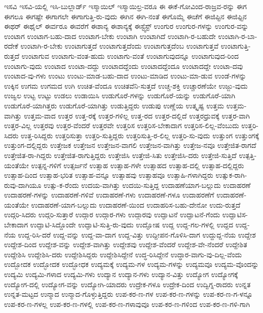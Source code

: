 {ಇಸವಿ
ಇಸವಿ-ಯಲ್ಲಿ
ಇಸಿ-ಬುಲ್ಲಾರ್ಡ್
ಇಸ್ಮಾಯಿಲ್
ಇಸ್ಮಾಯಿಲ್ರ-ವರೂ
ಈ
ಈಕೆ-ಗೋವಿಂದ-ರಾಜ್ರವ-ರನ್ನು
ಈಗ
ಈಗಲೂ
ಈಗಷ್ಟೇ
ಈಗಾಗಲೇ
ಈಗಾಗುತ್ತಿ-ರು-ವುದು
ಈಗಿನ
ಈಗಿ-ನಂತೆ
ಈಗೊಮ್ಮೆ
ಈಚೆಗೆ
ಈಜಿಪ್ಟಿನ
ಈಜಿಫ್ಟಿನ
ಈಥರ್
ಈಥೈಲ್
ಈರ್ವರೂ
ಈವರೆಗೆ
ಈಶಾನ್ಯ
ಈಶಾನ್ಯಕ್ಕೆ
ಈಸ್ಟ್ವೆಸ್ಟ್
ಉಂಗುರ
ಉಂಗುರ-ಗಳನ್ನು
ಉಂಗುರ-ವನ್ನು
ಉಂಟಾಗ
ಉಂಟಾಗ-ಬಹು-ದಾದ
ಉಂಟಾಗ-ಬೇಕು
ಉಂಟಾಗಿ
ಉಂಟಾಗಿದೆ
ಉಂಟಾಗಿ-ರ-ಬಹುದೇ
ಉಂಟಾಗಿ-ರ-ಬಾ-ರದೇಕೆ
ಉಂಟಾಗಿ-ರ-ಬೇಕು
ಉಂಟಾಗುತ್ತದೆ
ಉಂಟಾಗುತ್ತದೆಂದು
ಉಂಟಾಗುತ್ತದೆಂಬ
ಉಂಟಾಗುತ್ತವೆ
ಉಂಟಾಗುತ್ತಿ-ರುತ್ತದೆ
ಉಂಟಾಗುವ
ಉಂಟಾಗು-ವಂತ-ಹುದು
ಉಂಟಾಗು-ವಂತೆ
ಉಂಟಾಗುವುದನ್ನೂ
ಉಂಟಾಗುವುದ-ರಿಂದ
ಉಂಟಾಗು-ವುದು
ಉಂಟಾದ
ಉಂಟಾ-ದದ್ದು
ಉಂಟಾದದ್ದೆಂದು
ಉಂಟಾದದ್ದೆಂದೂ
ಉಂಟಾದದ್ದೇ
ಉಂಟಾ-ದವು
ಉಂಟಾದ-ವು-ಗಳು
ಉಂಟು
ಉಂಟು-ಮಾಡ-ಬಹು-ದಾದ
ಉಂಟು-ಮಾಡಿದ
ಉಂಟು-ಮಾ-ಡುವ
ಉಂಡೆ-ಗಳನ್ನು
ಉಕ್ಕಿನ
ಉಗಮ
ಉಗಮದ
ಉಗಿ
ಉಚಿತ-ವೆಂದೂ
ಉಚಿತವೆನಿ-ಸುತ್ತದೆ
ಉಚ್ಚ-ಶಕ್ತಿ
ಉಚ್ಚಾರಣೆಯೇ
ಉಜ್ಜು-ವುದು
ಉಜ್ವಲ
ಉಟ್ಟ
ಉಟ್ಟು
ಉಡಲು
ಉಡಾಯಿಸಿ
ಉಡುಗೊರೆ-ಗಳನ್ನು
ಉಡುಗೊರೆ-ಯನ್ನು
ಉಡುಗೊರೆ-ಯಾಗಿ
ಉಡುಗೊರೆ-ಯಾಗಿತ್ತರು
ಉಡುಗೊರೆ-ಯಾಗಿತ್ತು
ಉಡುತ್ತಿದ್ದರು
ಉಡುಪು
ಉಣ್ಣೆಯ
ಉತ್ಕೃಷ್ಟ
ಉತ್ತಮ
ಉತ್ತಮ-ವಾಗಿತ್ತು
ಉತ್ತಮ-ವಾದ
ಉತ್ತರ
ಉತ್ತ-ರಕ್ಕೆ
ಉತ್ತರ-ಗಳಿಲ್ಲ
ಉತ್ತ-ರದ
ಉತ್ತರ-ದಲ್ಲಿದೆ
ಉತ್ತರಧ್ರುವಕ್ಕೆ
ಉತ್ತರ-ವಾಗಿ
ಉತ್ತರ-ವಿಲ್ಲ
ಉತ್ತರವು
ಉತ್ತರ-ವೆಂದರೆ
ಉತ್ತರವೇ
ಉತ್ತರಿಸ
ಉತ್ತರಿಸ-ಬೇಕಾದಾಗ
ಉತ್ತರಿಸ-ಲಿಲ್ಲ-ವೆಂಬುದು
ಉತ್ತರಿ-ಸಿದರು
ಉತ್ತ-ರಿಸಿದ್ದರು
ಉತ್ತರಿಸುತ್ತಾ
ಉತ್ತರಿ-ಸುತ್ತಿದ್ದರು
ಉತ್ತರಿಸುತ್ತಿ-ರ-ಲಿಲ್ಲ
ಉತ್ತರಿ-ಸು-ವುದು
ಉತ್ತುಂಗ
ಉತ್ತುಂಗಕ್ಕೆ
ಉತ್ತುಂಗ-ದಲ್ಲಿದ್ದರು
ಉತ್ತೇಜಕ
ಉತ್ತೇಜನ
ಉತ್ತೇಜನ-ವಾಗಲಿ
ಉತ್ತೇಜನ-ವಾಗಿತ್ತು
ಉತ್ತೇಜ-ನವೂ
ಉತ್ತೇಜಿತ-ರಾಗದೆ
ಉತ್ತೇಜಿತ-ರಾ-ಗಿದ್ದರು
ಉತ್ತೇಜಿತ-ರಾಗುತ್ತಿದ್ದರು
ಉತ್ತೇಜಿಸಿ
ಉತ್ತೇಜಿ-ಸಿತು
ಉತ್ತೇಜಿಸಿ-ದರು
ಉತ್ತೇಜಿ-ಸುತ್ತಿದೆ
ಉತ್ಪತ್ತಿ-ಯಂತೆಯೇ
ಉತ್ಪನ್ನ-ಗಳಿಗೆ
ಉತ್ಸರ್ಜನೆ
ಉತ್ಸಾಹ
ಉತ್ಸಾಹ-ಗಳೇ
ಉತ್ಸಾಹದ
ಉತ್ಸಾಹ-ದಲ್ಲಿ
ಉತ್ಸಾಹ-ದಲ್ಲಿದ್ದರು
ಉತ್ಸಾಹ-ದಿಂದ
ಉತ್ಸಾಹ-ಭರಿತ
ಉತ್ಸಾಹ-ವನ್ನೂ
ಉತ್ಸಾಹವು
ಉತ್ಸಾಹವೂ
ಉತ್ಸಾಹಿ-ಗಳಾಗಿದ್ದರು
ಉತ್ಸುಕ-ರಾಗಿ-ರುವು-ದಾಗಿಯೂ
ಉತ್ಸು-ಕ-ರೆಂದು
ಉದಯ-ವಾಗಿತ್ತು
ಉದಯಿ-ಸುತ್ತಿದ್ದ
ಉದಾಹಣೆಯಾಗ-ಬಲ್ಲುದು
ಉದಾಹರಣೆ
ಉದಾಹರಣೆ-ಗಳನ್ನು
ಉದಾಹರಣೆ-ಗಳಿವೆ
ಉದಾಹರಣೆ-ಗಳು
ಉದಾಹರಣೆ-ಗಳೂ
ಉದಾಹರಣೆಗೆ
ಉದಾಹರಣೆ-ಯಂತೆಯೇ
ಉದಾಹರಣೆ-ಯಾಗ-ಬಲ್ಲುದು
ಉದಾಹರಣೆ-ಯಿಂದ
ಉದಾಹರಿಸ-ಬಹು-ದೇನೋ
ಉದು-ರುತ್ತದೆ
ಉದ್ಗರಿ-ಸಿದರು
ಉದ್ಗರಿ-ಸುತ್ತಾರೆ
ಉದ್ಗಾರ
ಉದ್ಗಾರ-ಗಳು
ಉದ್ಗಾರವು
ಉದ್ಘಾಟನೆ
ಉದ್ಘಾಟನೆ-ಗೆಂದು
ಉದ್ಘಾಟಿಸ-ಬೇಕಾದಾಗ
ಉದ್ಘಾಟಿ-ಸಿದ್ದೊಂದೇ
ಉದ್ಘಾಟಿ-ಸುತ್ತಿ-ರು-ವುದು
ಉದ್ಘೋಷ
ಉದ್ದ
ಉದ್ದ-ಗಲ-ಗಳಲ್ಲಿ
ಉದ್ದದ
ಉದ್ದ-ನೆಯ
ಉದ್ದ-ರಿಸಿ-ದರೆ
ಉದ್ದ-ವನ್ನು
ಉದ್ದ-ವಾ-ದಾಗ
ಉದ್ದ-ವಿತ್ತು
ಉದ್ದೀಪನ-ಗೊಳಿಸಿ-ದಾಗ
ಉದ್ದುದ್ದ-ನೆಯ
ಉದ್ದೇಶ
ಉದ್ದೇಶ-ದಿಂದ
ಉದ್ದೇಶ-ವನ್ನು
ಉದ್ದೇಶ-ವಾಗಿತ್ತು
ಉದ್ದೇಶವು
ಉದ್ದೇಶ-ವೆಂದರೆ
ಉದ್ದೇಶ-ವೇ-ನೆಂದರೆ
ಉದ್ದೇಶಿತ
ಉದ್ದೇಶಿಸಿ
ಉದ್ದೇಶಿಸಿ-ದರು
ಉದ್ದೇಶಿಸಿದ್ದರು
ಉದ್ದೇಶಿಸಿದ್ದೇನೆ
ಉದ್ಧ-ರಿಸಿದ್ದೇನೆ
ಉದ್ಧಾರ-ವಾಗು-ವು-ದಿಲ್ಲ-ವೆಂದು
ಉದ್ಬೋದಕ
ಉದ್ಭೋದಕ
ಉದ್ಭೋಧಕ
ಉದ್ಯಮಕ್ಕೆ
ಉದ್ಯಮ-ಗಳ
ಉದ್ಯಮ-ಗಳನ್ನು
ಉದ್ಯಮವೂ
ಉದ್ಯಮ-ವೊಂದನ್ನು
ಉದ್ಯಮಿ
ಉದ್ಯಮಿ-ಗಳಾದ
ಉದ್ಯಮಿ-ಗಳು
ಉದ್ಯಾನ
ಉದ್ಯಾನ-ಗಳು
ಉದ್ಯಾನ-ವಿತ್ತು
ಉದ್ಯೋಗ
ಉದ್ಯೋಗಕ್ಕೆ
ಉದ್ಯೋಗ-ದಲ್ಲಿ
ಉದ್ಯೋಗ-ವನ್ನು
ಉದ್ಯೋಗಿ-ಯಾದರು
ಉದ್ರೇಕ-ಗಳೂ
ಉದ್ರೇಕ-ದಿಂದ
ಉದ್ವಿಗ್ನ-ರಾದರು
ಉನ್ನತ
ಉನ್ನತ-ಮಟ್ಟದ
ಉನ್ಮಾದ
ಉನ್ಮಾದ-ಗೊಳ್ಳುತ್ತಿದ್ದರು
ಉಪ-ಕರ-ಣ-ಗಳ
ಉಪ-ಕರ-ಣ-ಗಳನ್ನು
ಉಪ-ಕರ-ಣ-ಗ-ಳನ್ನೂ
ಉಪ-ಕರ-ಣ-ಗಳಲ್ಲ
ಉಪ-ಕರ-ಣ-ಗಳಲ್ಲಿ
ಉಪ-ಕರ-ಣ-ಗಳಾವುವೂ
ಉಪ-ಕರ-ಣ-ಗಳಿಂದ
ಉಪ-ಕರ-ಣ-ಗಳಿ-ಗಾಗಿ
}
